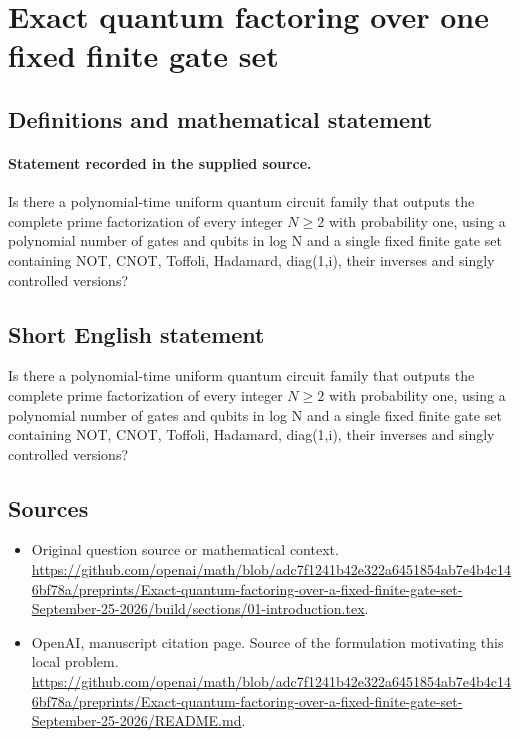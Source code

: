 \documentclass[11pt]{article}
\begin{document}
\section*{Exact quantum factoring over one fixed finite gate set}\label{statement}
\subsection{Definitions and mathematical statement}
\paragraph{Statement recorded in the supplied source.}
Is there a polynomial-time uniform quantum circuit family that outputs the complete prime factorization of every integer $N\geq 2$ with probability one, using a polynomial number of gates and qubits in log N and a single fixed finite gate set containing NOT, CNOT, Toffoli, Hadamard, diag(1,i), their inverses and singly controlled versions?
\subsection{Short English statement}
Is there a polynomial-time uniform quantum circuit family that outputs the complete prime factorization of every integer $N\geq 2$ with probability one, using a polynomial number of gates and qubits in log N and a single fixed finite gate set containing NOT, CNOT, Toffoli, Hadamard, diag(1,i), their inverses and singly controlled versions?
\subsection{Sources}
\begin{itemize}
\item[S1] Original question source or mathematical context.
\url{https://github.com/openai/math/blob/adc7f1241b42e322a6451854ab7e4b4c146bf78a/preprints/Exact-quantum-factoring-over-a-fixed-finite-gate-set-September-25-2026/build/sections/01-introduction.tex}.
\item[S2] OpenAI, manuscript citation page. Source of the formulation motivating this local problem.
\url{https://github.com/openai/math/blob/adc7f1241b42e322a6451854ab7e4b4c146bf78a/preprints/Exact-quantum-factoring-over-a-fixed-finite-gate-set-September-25-2026/README.md}.
\end{itemize}
\end{document}
